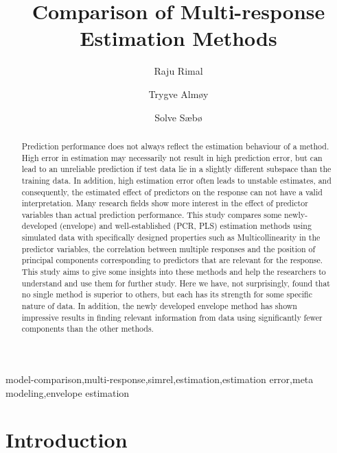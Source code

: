 \documentclass[12pt,3p,authoryear]{elsarticle}
\begin{document}
\begin{frontmatter}

  \title{Comparison of Multi-response Estimation Methods}
  
    \author[KBM]{Raju Rimal}
    \author[KBM]{Trygve Almøy}
  
    \author[KBM]{Solve Sæbø}
  
      \address[KBM]{Faculty of Chemistry and Bioinformatics, Norwegian University of Life
Sciences, Ås, Norway}
  
  \begin{abstract}
  Prediction performance does not always reflect the estimation behaviour
  of a method. High error in estimation may necessarily not result in high
  prediction error, but can lead to an unreliable prediction if test data
  lie in a slightly different subspace than the training data. In
  addition, high estimation error often leads to unstable estimates, and
  consequently, the estimated effect of predictors on the response can not
  have a valid interpretation. Many research fields show more interest in
  the effect of predictor variables than actual prediction performance.
  This study compares some newly-developed (envelope) and well-established
  (PCR, PLS) estimation methods using simulated data with specifically
  designed properties such as Multicollinearity in the predictor
  variables, the correlation between multiple responses and the position
  of principal components corresponding to predictors that are relevant
  for the response. This study aims to give some insights into these
  methods and help the researchers to understand and use them for further
  study. Here we have, not surprisingly, found that no single method is
  superior to others, but each has its strength for some specific nature
  of data. In addition, the newly developed envelope method has shown
  impressive results in finding relevant information from data using
  significantly fewer components than the other methods.
  \end{abstract}
   \begin{keyword} model-comparison,multi-response,simrel,estimation,estimation error,meta modeling,envelope estimation\end{keyword}

\end{frontmatter}

\section{Introduction}\label{introduction}
\end{document}
